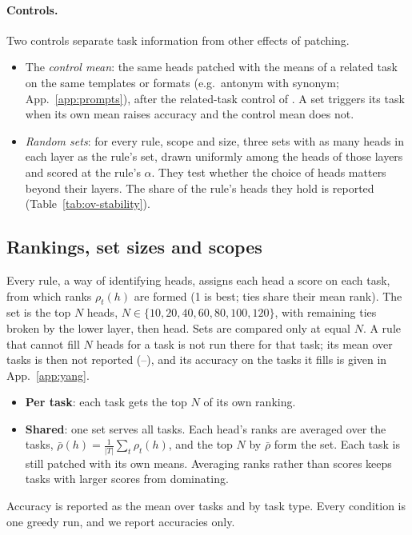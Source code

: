 \documentclass[10pt,a4paper]{article}
\begin{document}
\paragraph{Controls.} Two controls separate task information from other effects of patching.
\begin{itemize}
\item The \emph{control mean}: the same heads patched with the means of a related task on the same templates or formats (e.g.\ antonym with synonym; App.~\ref{app:prompts}), after the related-task control of \citet[Sec.~2.3.2]{yang2026shared}. A set triggers its task when its own mean raises accuracy and the control mean does not.
\item \emph{Random sets}: for every rule, scope and size, three sets with as many heads in each layer as the rule's set, drawn uniformly among the heads of those layers and scored at the rule's $\alpha$. They test whether the choice of heads matters beyond their layers. The share of the rule's heads they hold is reported (Table~\ref{tab:ov-stability}).
\end{itemize}

\subsection{Rankings, set sizes and scopes}\label{sec:scopes}

Every rule, a way of identifying heads, assigns each head a score on each task, from which ranks $\rho_t(h)$ are formed (1 is best; ties share their mean rank). The set is the top $N$ heads, $N\in\{10,20,40,60,80,100,120\}$, with remaining ties broken by the lower layer, then head. Sets are compared only at equal $N$. A rule that cannot fill $N$ heads for a task is not run there for that task; its mean over tasks is then not reported (--), and its accuracy on the tasks it fills is given in App.~\ref{app:yang}.

\begin{itemize}
\item \textbf{Per task}: each task gets the top $N$ of its own ranking.
\item \textbf{Shared}: one set serves all tasks. Each head's ranks are averaged over the tasks, $\bar\rho(h) = \frac{1}{|T|}\sum_{t} \rho_t(h)$, and the top $N$ by $\bar\rho$ form the set. Each task is still patched with its own means. Averaging ranks rather than scores keeps tasks with larger scores from dominating.
\end{itemize}
Accuracy is reported as the mean over tasks and by task type. Every condition is one greedy run, and we report accuracies only.
\end{document}
